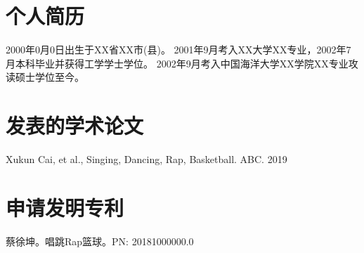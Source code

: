 \documentclass[pdf,count]{oucthesis}
\begin{document}
\begin{profile}
\section*{个人简历}
2000年0月0日出生于XX省XX市(县)。
2001年9月考入XX大学XX专业，2002年7月本科毕业并获得工学学士学位。
2002年9月考入中国海洋大学XX学院XX专业攻读硕士学位至今。

\section*{发表的学术论文}
\noindent[1] Xukun Cai, et al., Singing, Dancing, Rap, Basketball. ABC. 2019

\section*{申请发明专利}
\noindent[1]蔡徐坤。唱跳Rap篮球。PN: 20181000000.0
\end{profile}
\end{document}
